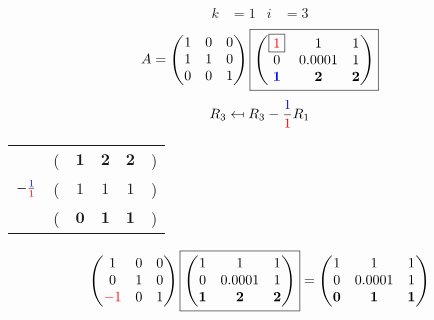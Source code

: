 \documentclass[pdf]{beamer}
\begin{document}
\begin{frame}{}\begin{align*} k &= 1 & i &= 3 \end{align*} $$A=\begin{pmatrix}1&0&0\\1&1&0\\0&0&1\end{pmatrix} \boxed{\begin{pmatrix}\boxed{{\color{red}1}}&1&1\\0&0.0001&1\\\mathbf{{\color{blue}1}}&\mathbf{2}&\mathbf{2}\end{pmatrix}} $$ $$R_3 \mapsfrom R_3 - \frac{{\color{blue}1}}{{\color{red}1}} R_1$$ \begin{center}\begin{tabular}{cccccc}  &(& $ \mathbf{1} $ & $ \mathbf{2} $ & $ \mathbf{2} $ &)\\$ -\frac{{\color{blue}1}}{{\color{red}1}} $&(& $ 1 $ & $ 1 $ & $ 1 $ &)\\\hline  &(& $ \mathbf{0} $ & $ \mathbf{1} $ & $ \mathbf{1} $ &) \end{tabular}\end{center} $$ \begin{pmatrix}1&0&0\\0&1&0\\{\color{red}-1}&0&1\end{pmatrix} \boxed{\begin{pmatrix}1&1&1\\0&0.0001&1\\\mathbf{1}&\mathbf{2}&\mathbf{2}\end{pmatrix}} = \begin{pmatrix}1&1&1\\0&0.0001&1\\\mathbf{0}&\mathbf{1}&\mathbf{1}\end{pmatrix} $$\end{frame}
\end{document}
